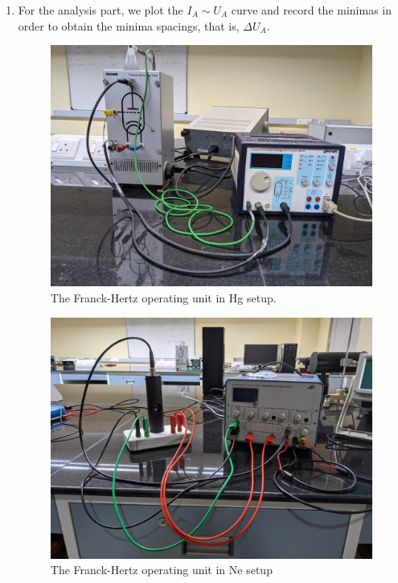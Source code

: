 \documentclass[%
 reprint,
 amsmath,amssymb,
 aps,
]{revtex4-2}
\begin{document}
\begin{enumerate}
        \item For the analysis part, we plot the $I_A \sim U_A$ curve and record the minimas in order to obtain the minima spacings, that is, $\Delta U_A$.
    \begin{figure}
        \centering
        \includegraphics[scale = 0.12]{Figures/hgsetup.jpg}
        \caption{The Franck-Hertz operating unit in Hg setup.}
        \label{fig:HgSetup}
    \end{figure}
    \begin{figure}
        \centering
        \includegraphics[scale = 0.12]{Figures/nesetup.jpg}
        \caption{The Franck-Hertz operating unit in Ne setup}
        \label{fig:NeSetup}
    \end{figure}
    \end{enumerate}
    
\end{document}
